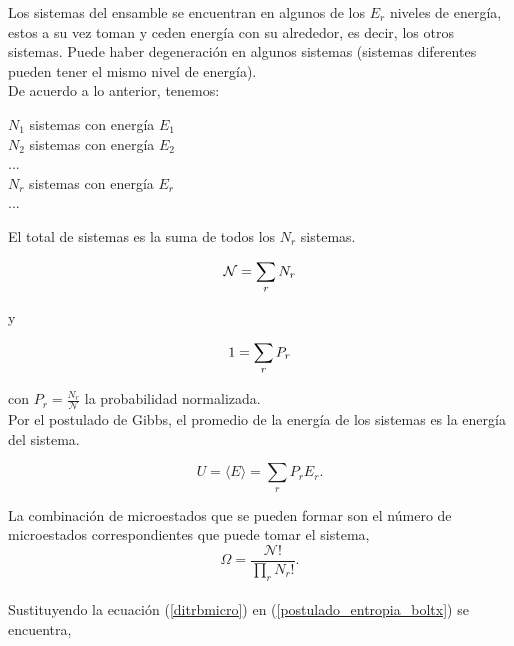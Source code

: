 \newpage

Los sistemas del ensamble se encuentran en algunos de los $E_r$ niveles de energía, estos a su vez toman y ceden energía con su alrededor, es decir, los otros sistemas. Puede haber degeneración en algunos sistemas (sistemas diferentes pueden tener el mismo nivel de energía).\\

De acuerdo a lo anterior, tenemos:\\
\begin{center}
    $N_1$ sistemas con energía $E_1$\\
    $N_2$ sistemas con energía $E_2$\\
    ...\\
    $N_r$ sistemas con energía $E_r$\\
    ...\\
\end{center}

El total de sistemas es la suma de todos los $N_r$ sistemas.

\begin{equation} \label{conteoprob}
    \mathcal{N} = \sum_r N_r \\
\end{equation}

y

\begin{equation} \label{restrprob}
    1 = \sum_r P_r \\
\end{equation}

con $P_r = \frac{N_r}{\mathcal{N}}$ la probabilidad normalizada.\\

Por el postulado de Gibbs, el promedio de la energía de los sistemas es la energía del sistema.

\begin{equation} \label{energiaprob}
    U = \langle E\rangle = \sum_r P_r E_r.
\end{equation}

La combinación de microestados que se pueden formar son el número de microestados correspondientes que puede tomar el sistema, \\

\begin{equation} \label{ditrbmicro}
    \Omega = \frac{\mathcal{N}!}{\prod_r N_r!}.
\end{equation}\\

Sustituyendo la ecuación (\ref{ditrbmicro}) en (\ref{postulado_entropia_boltx}) se encuentra,

